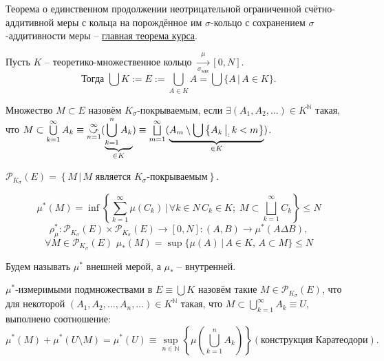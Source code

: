 \documentclass[a4paper, 12pt]{article}
\begin{document}
    

\begin{remark}
    Теорема о единственном продолжении неотрицательной ограниченной счётно-аддитивной меры с кольца на порождённое им $\sigma$-кольцо с сохранением $\sigma$-аддитивности меры -- \underline{главная теорема курса}.
\end{remark}

\begin{designation}
Пусть $K$ -- теоретико-множественное кольцо $\xrightarrow[\sigma_{\text{адд}}]{\mu} [0, N]$. 
$$ \text{Тогда } \bigcup K := E := \bigcup \limits_{A \in K} A = \bigcup \{A\, |\, A \in K\}.$$
\end{designation}

\begin{definition}
    Множество $M \subset E$ назовём $K_{\sigma}$-покрываемым, если $\exists (A_1, A_2, \dots) \in K^{\mathbb{N}}$ такая, 
    что $M \subset \bigcup \limits_{k = 1}^{\infty} A_k \equiv \cuparr{n = 1}{\infty} ( \underbrace{\bigcup \limits_{k = 1}^{n} A_k}_{\in K} ) \equiv \bigsqcup \limits_{m = 1}^{\infty} ( \underbrace{A_m \setminus  \bigcup \left\{ A_k \, \big|_: \, k < m \right\}}_{\in K} ) $.
\end{definition}

\begin{designation}
    $\mathcal{P}_{K_{\sigma}}(E) = \left\{M \,\big|\, M \text{ является } K_{\sigma}\text{-покрываемым}\right\}$.
\end{designation}

$$\mu^*(M) = \inf \left\{\sum \limits_{k = 1}^{\infty} \mu(C_k) \,\big|\, \forall k \in N\, C_k \in K;\; M \subset \bigsqcup \limits_{k = 1}^{\infty} C_k \right\} \leqslant N$$
$$\rho^*_{\mu}: \mathcal{P}_{K_{\sigma}}(E) \times \mathcal{P}_{K_{\sigma}}(E) \rightarrow [0, N]: (A, B) \rightarrow \mu^*(A \Delta B),$$ 
$$\forall M \in \mathcal{P}_{K_{\sigma}}(E) \,\, \mu_*(M) = \sup \{ \mu(A) \,\big|\, A \in K, \, A \subset M  \} \leqslant N$$


Будем называть $\mu^*$ внешней мерой, а $\mu_*$ -- внутренней.

\begin{definition}
    $\mu^*$-измеримыми подмножествами в $E \equiv \bigcup K$ назовём такие $M \in \mathcal{P}_{K_{\sigma}}(E)$, что для некоторой $(A_1, A_2, \dots, A_n, \dots) \in K^{\mathbb{N}}$ такая, что $M \subset \bigcup \limits_{k = 1}^{\infty} A_k \equiv U$, выполнено соотношение:
    $$ \mu^* (M) + \mu^*(U \setminus M) = \mu^*(U) \equiv \sup \limits_{n \in \mathbb{N}}\left\{ \mu \left( \bigcup \limits_{k = 1}^{n} A_k \right)\right\} (\text{конструкция Каратеодори}).$$
\end{definition}
\end{document}
